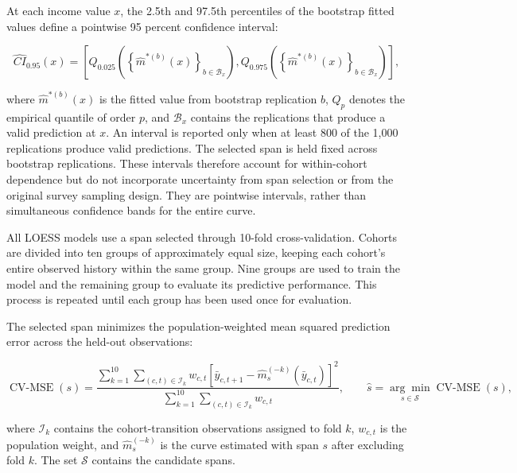 \documentclass{article}
\begin{document}
At each income value $x$, the 2.5th and 97.5th percentiles of the bootstrap fitted values define a pointwise 95 percent confidence interval:

\begin{equation}
    \widehat{CI}_{0.95}(x)
    =
    \left[
        Q_{0.025}\left(
            \left\{\hat{m}^{*(b)}(x)\right\}_{b\in\mathcal{B}_x}
        \right),
        Q_{0.975}\left(
            \left\{\hat{m}^{*(b)}(x)\right\}_{b\in\mathcal{B}_x}
        \right)
    \right],
    \label{eq:bootstrap_ci}
\end{equation}

where $\hat{m}^{*(b)}(x)$ is the fitted value from bootstrap replication $b$, $Q_p$ denotes the empirical quantile of order $p$, and $\mathcal{B}_x$ contains the replications that produce a valid prediction at $x$. An interval is reported only when at least 800 of the 1,000 replications produce valid predictions. The selected span is held fixed across bootstrap replications. These intervals therefore account for within-cohort dependence but do not incorporate uncertainty from span selection or from the original survey sampling design. They are pointwise intervals, rather than simultaneous confidence bands for the entire curve.

All LOESS models use a span selected through 10-fold cross-validation. Cohorts are divided into ten groups of approximately equal size, keeping each cohort's entire observed history within the same group. Nine groups are used to train the model and the remaining group to evaluate its predictive performance. This process is repeated until each group has been used once for evaluation.

The selected span minimizes the population-weighted mean squared prediction error across the held-out observations:

\begin{equation}
    \operatorname{CV\text{-}MSE}(s)
    =
    \frac{
        \displaystyle\sum_{k=1}^{10}
        \sum_{(c,t)\in\mathcal{I}_k}
        w_{c,t}
        \left[
            \bar{y}_{c,t+1}
            -
            \hat{m}_{s}^{(-k)}(\bar{y}_{c,t})
        \right]^2
    }{
        \displaystyle\sum_{k=1}^{10}
        \sum_{(c,t)\in\mathcal{I}_k} w_{c,t}
    },
    \qquad
    \hat{s}
    =
    \underset{s\in\mathcal{S}}{\arg\min}
    \operatorname{CV\text{-}MSE}(s),
    \label{eq:cv_mse}
\end{equation}

where $\mathcal{I}_k$ contains the cohort-transition observations assigned to fold $k$, $w_{c,t}$ is the population weight, and $\hat{m}_{s}^{(-k)}$ is the curve estimated with span $s$ after excluding fold $k$. The set $\mathcal{S}$ contains the candidate spans.
\end{document}
